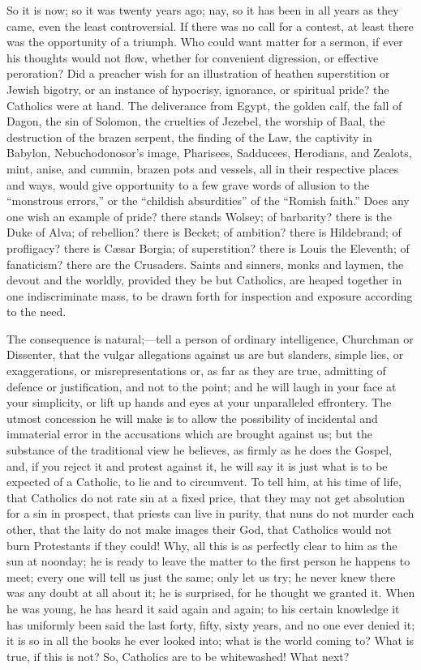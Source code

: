 So it is now; so it was twenty years ago; nay, so it
has been in all years as they came, even the least
controversial. If there was no call for a contest, at
least there was the opportunity of a triumph. Who could
want matter for a sermon, if ever his thoughts would not
flow, whether for convenient digression, or effective
peroration? Did a preacher wish for an illustration of
heathen superstition or Jewish bigotry, or an instance of
hypocrisy, ignorance, or spiritual pride? the Catholics
were at hand. The deliverance from Egypt, the golden
calf, the fall of Dagon, the sin of Solomon, the
cruelties of Jezebel, the worship of Baal, the
destruction of the brazen serpent, the finding of the
Law, the captivity in Babylon, Nebuchodonosor's image,
Pharisees, Sadducees, Herodians, and Zealots, mint,
anise, and cummin, brazen pots and vessels, all in their
respective places and ways, would give opportunity to a
few grave words of allusion to the ``monstrous
errors,'' or the ``childish absurdities'' of
the ``Romish faith.'' Does any one wish an
example of pride? there stands Wolsey; of barbarity?
there is the Duke of Alva; of rebellion? there is Becket;
of ambition? there is Hildebrand; of profligacy? there is Cæsar Borgia; of superstition? there is Louis the
Eleventh; of fanaticism? there are the Crusaders. Saints
and sinners, monks and laymen, the devout and the
worldly, provided they be but Catholics, are heaped
together in one indiscriminate mass, to be drawn forth
for inspection and exposure according to the need.

The consequence is natural;—tell a person of
ordinary intelligence, Churchman or Dissenter, that the
vulgar allegations against us are but slanders, simple
lies, or exaggerations, or misrepresentations or, as far
as they are true, admitting of defence or justification,
and not to the point; and he will laugh in your face at
your simplicity, or lift up hands and eyes at your
unparalleled effrontery. The utmost concession he will
make is to allow the possibility of incidental and
immaterial error in the accusations which are brought
against us; but the substance of the traditional view he
believes, as firmly as he does the Gospel, and, if you
reject it and protest against it, he will say it is just
what is to be expected of a Catholic, to lie and to
circumvent. To tell him, at his time of life, that
Catholics do not rate sin at a fixed price, that they may
not get absolution for a sin in prospect, that priests
can live in purity, that nuns do not murder each other,
that the laity do not make images their God, that
Catholics would not burn Protestants if they could! Why,
all this is as perfectly clear to him as the sun at
noonday; he is ready to leave the matter to the first
person he happens to meet; every one will tell us just
the same; only let us try; he never knew there was any
doubt at all about it; he is surprised, for he thought we
granted it. When he was young, he has heard it said again
and again; to his certain knowledge it has uniformly been
said the last forty, fifty, sixty years, and no one ever
denied it; it is so in all the books he ever looked into;
what is the world coming to? What is true, if this is
not? So, Catholics are to be whitewashed! What next?

